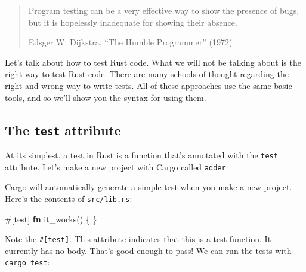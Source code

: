 \documentclass[a4paper,]{book}
\newenvironment{Shaded}{\begin{snugshade}}{\end{snugshade}}
\newcommand{\KeywordTok}[1]{\textcolor[rgb]{0.13,0.29,0.53}{\textbf{{#1}}}}
\newcommand{\OtherTok}[1]{\textcolor[rgb]{0.56,0.35,0.01}{{#1}}}
\newcommand{\NormalTok}[1]{{#1}}
\begin{document}
\begin{quote}
Program testing can be a very effective way to show the presence of
bugs, but it is hopelessly inadequate for showing their absence.

Edsger W. Dijkstra, ``The Humble Programmer'' (1972)
\end{quote}

Let's talk about how to test Rust code. What we will not be talking
about is the right way to test Rust code. There are many schools of
thought regarding the right and wrong way to write tests. All of these
approaches use the same basic tools, and so we'll show you the syntax
for using them.

\subsection{\texorpdfstring{The \texttt{test}
attribute}{The test attribute}}\label{the-test-attribute}

At its simplest, a test in Rust is a function that's annotated with the
\texttt{test} attribute. Let's make a new project with Cargo called
\texttt{adder}:

\begin{Shaded}
\end{Shaded}

Cargo will automatically generate a simple test when you make a new
project. Here's the contents of \texttt{src/lib.rs}:

\begin{Shaded}
\begin{Highlighting}[]
\OtherTok{#[}\NormalTok{test}\OtherTok{]}
\KeywordTok{fn} \NormalTok{it_works() \{}
\NormalTok{\}}
\end{Highlighting}
\end{Shaded}

Note the \texttt{\#{[}test{]}}. This attribute indicates that this is a
test function. It currently has no body. That's good enough to pass! We
can run the tests with \texttt{cargo\ test}:
\end{document}
